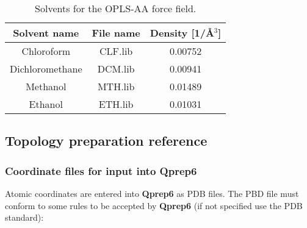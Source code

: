 \documentclass[a4paper,11pt]{article}
\begin{document}
\begin{table}[htbp]
\begin{center}
\caption{Solvents for the OPLS-AA force field.}
\label{tab:solvents}
\small
\begin{tabular}{|c|c|c|}
	\hline \textbf{Solvent name} & \textbf{File name} & \textbf{Density [1/{\AA}$^{3}$]} \\ 
	\hline Chloroform            & CLF.lib     & 0.00752             \\ 
	\hline Dichloromethane       & DCM.lib     & 0.00941             \\ 
	\hline Methanol              & MTH.lib     & 0.01489             \\ 
	\hline Ethanol               & ETH.lib     & 0.01031             \\ 
\hline
\end{tabular}
\normalsize
\end{center}
\end{table}




\subsection{Topology preparation reference}\label{subsec:top_prep_ref}
\subsubsection{Coordinate files for input into \textbf{Qprep6}}
Atomic coordinates are entered into \textbf{Qprep6} as PDB files. The PBD
file must conform to some rules to be accepted by \textbf{Qprep6} (if not
specified use the PDB standard):
\end{document}
